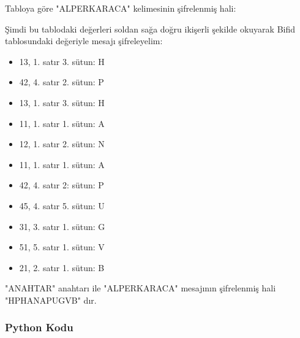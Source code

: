 \newpage

Tabloya göre "ALPERKARACA" kelimesinin şifrelenmiş hali:

\begin{table}[ht]
\centering
{}
\end{table}

Şimdi bu tablodaki değerleri soldan sağa doğru ikişerli şekilde okuyarak Bifid tablosundaki değeriyle mesajı şifreleyelim:

\begin{itemize}
    \item 13, 1. satır 3. sütun: H
    \item 42, 4. satır 2. sütun: P
    \item 13, 1. satır 3. sütun: H
    \item 11, 1. satır 1. sütun: A
    \item 12, 1. satır 2. sütun: N
    \item 11, 1. satır 1. sütun: A
    \item 42, 4. satır 2: sütun: P
    \item 45, 4. satır 5. sütun: U
    \item 31, 3. satır 1. sütun: G
    \item 51, 5. satır 1. sütun: V
    \item 21, 2. satır 1. sütun: B
\end{itemize}

"ANAHTAR" anahtarı ile "ALPERKARACA" mesajının şifrelenmiş hali "HPHANAPUGVB" dır.

\subsubsection{Python Kodu}

